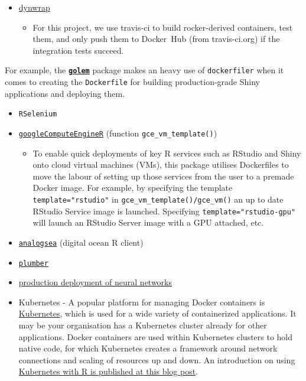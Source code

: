 \begin{itemize}
\tightlist
\item
  \href{https://github.com/dynverse/dynwrap_containers/blob/master/.travis.yml}{dynwrap}
  \citep{rcannood}

  \begin{itemize}
  \tightlist
  \item
    For this project, we use travis-ci to build rocker-derived
    containers, test them, and only push them to Docker~Hub (from
    travis-ci.org) if the integration tests succeed.
  \end{itemize}
\end{itemize}

For example, the
\textbf{\href{https://github.com/ThinkR-open/golem}{\texttt{golem}}}
package makes an heavy use of \texttt{dockerfiler} when it comes to
creating the \texttt{Dockerfile} for building production-grade Shiny
applications and deploying them.

\begin{itemize}
\tightlist
\item
  \texttt{RSelenium}
\item
  \href{https://cloudyr.github.io/googleComputeEngineR/}{\texttt{googleComputeEngineR}}
  (function \texttt{gce\_vm\_template()})

  \begin{itemize}
  \tightlist
  \item
    To enable quick deployments of key R services such as RStudio and
    Shiny onto cloud virtual machines (VMs), this package utilises
    Dockerfiles to move the labour of setting up those services from the
    user to a premade Docker image. For example, by specifying the
    template \texttt{template="rstudio"} in
    \texttt{gce\_vm\_template()/gce\_vm()} an up to date RStudio Service
    image is launched. Specifying \texttt{template="rstudio-gpu"} will
    launch an RStudio Server image with a GPU attached, etc.\\
  \end{itemize}
\item
  \href{https://github.com/sckott/analogsea}{\texttt{analogsea}}
  (digital ocean R client)
\item
  \href{https://www.rplumber.io/docs/hosting.html\#docker}{\texttt{plumber}}
\item
  \href{https://github.com/tmobile/r-tensorflow-api}{production
  deployment of neural networks} \citep[\citet{nolistic}]{jnolis}
\item
  Kubernetes - A popular platform for managing Docker containers is
  \href{https://kubernetes.io/}{Kubernetes}, which is used for a wide
  variety of containerized applications. It may be your organisation has
  a Kubernetes cluster already for other applications. Docker containers
  are used within Kubernetes clusters to hold native code, for which
  Kubernetes creates a framework around network connections and scaling
  of resources up and down. An introduction on using
  \href{https://code.markedmondson.me/r-on-kubernetes-serverless-shiny-r-apis-and-scheduled-scripts/}{Kubernetes
  with R is published at this blog post}.
\end{itemize}

